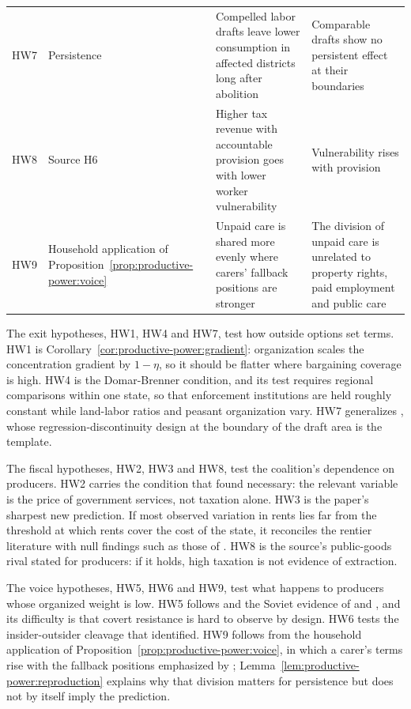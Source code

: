 \documentclass[11pt,letterpaper]{article}
\theoremstyle{definition}
\theoremstyle{remark}
\begin{document}
\begin{table}[t]
\begin{tabularx}{\textwidth}{@{}L{1.0cm}L{2.4cm}YY@{}}
HW7 & Persistence & Compelled labor drafts leave lower consumption in affected districts long after abolition & Comparable drafts show no persistent effect at their boundaries \\
HW8 & Source H6 & Higher tax revenue with accountable provision goes with lower worker vulnerability & Vulnerability rises with provision \\
HW9 & Household application of Proposition~\ref{prop:productive-power:voice} & Unpaid care is shared more evenly where carers' fallback positions are stronger & The division of unpaid care is unrelated to property rights, paid employment and public care \\
\bottomrule
\end{tabularx}
\end{table}

The exit hypotheses, HW1, HW4 and HW7, test how outside options set terms. HW1 is Corollary~\ref{cor:productive-power:gradient}: organization scales the concentration gradient by $1-\eta$, so it should be flatter where bargaining coverage is high. HW4 is the Domar-Brenner condition, and its test requires regional comparisons within one state, so that enforcement institutions are held roughly constant while land-labor ratios and peasant organization vary. HW7 generalizes \citet{dell2010}, whose regression-discontinuity design at the boundary of the draft area is the template.

The fiscal hypotheses, HW2, HW3 and HW8, test the coalition's dependence on producers. HW2 carries the condition that \citet{ross2004} found necessary: the relevant variable is the price of government services, not taxation alone. HW3 is the paper's sharpest new prediction. If most observed variation in rents lies far from the threshold at which rents cover the cost of the state, it reconciles the rentier literature with null findings such as those of \citet{habermenaldo2011}. HW8 is the source's public-goods rival stated for producers: if it holds, high taxation is not evidence of extraction.

The voice hypotheses, HW5, HW6 and HW9, test what happens to producers whose organized weight is low. HW5 follows \citet{scott1985} and the Soviet evidence of \citet{fitzpatrick1994} and \citet{filtzer1986}, and its difficulty is that covert resistance is hard to observe by design. HW6 tests the insider-outsider cleavage that \citet{rueda2005} identified. HW9 follows from the household application of Proposition~\ref{prop:productive-power:voice}, in which a carer's terms rise with the fallback positions emphasized by \citet{agarwal1997}; Lemma~\ref{lem:productive-power:reproduction} explains why that division matters for persistence but does not by itself imply the prediction.
\end{document}
